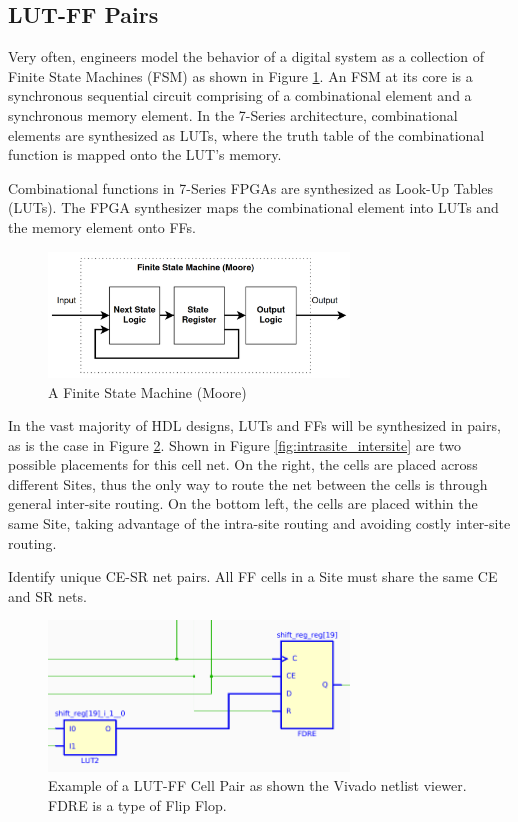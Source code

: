 \documentclass[twocolumn]{article}
\begin{document}
        \subsection{LUT-FF Pairs}
            Very often, engineers model the behavior of a digital system as a collection of Finite State Machines (FSM) as shown in Figure \ref{fig:fsm}. 
            An FSM at its core is a synchronous sequential circuit comprising of a combinational element and a synchronous memory element. 
            In the 7-Series architecture, combinational elements are synthesized as LUTs, where the truth table of the combinational function is mapped onto the LUT's memory. 

            Combinational functions in 7-Series FPGAs are synthesized as Look-Up Tables (LUTs). 
            The FPGA synthesizer maps the combinational element into LUTs and the memory element onto FFs. 

            \begin{figure}[H]
                \centering
                \includegraphics[width=8.0cm]{figures/fsm.png}
                \caption{A Finite State Machine (Moore)}
                \label{fig:fsm}
            \end{figure}

            In the vast majority of HDL designs, LUTs and FFs will be synthesized in pairs, as is the case in Figure \ref{fig:lut_ff_pair}. 
            Shown in Figure \ref{fig:intrasite_intersite} are two possible placements for this cell net. 
            On the right, the cells are placed across different Sites, thus the only way to route the net between the cells is through general inter-site routing. 
            On the bottom left, the cells are placed within the same Site, taking advantage of the intra-site routing and avoiding costly inter-site routing. 

            Identify unique CE-SR net pairs. 
            All FF cells in a Site must share the same CE and SR nets. 

            \begin{figure}[H]
                \centering
                \includegraphics[width=8.0cm]{figures/lut_ff_pair.png}
                \caption{
                    Example of a LUT-FF Cell Pair as shown the Vivado netlist viewer. 
                    FDRE is a type of Flip Flop. 
                }
                \label{fig:lut_ff_pair}
            \end{figure}
\end{document}
